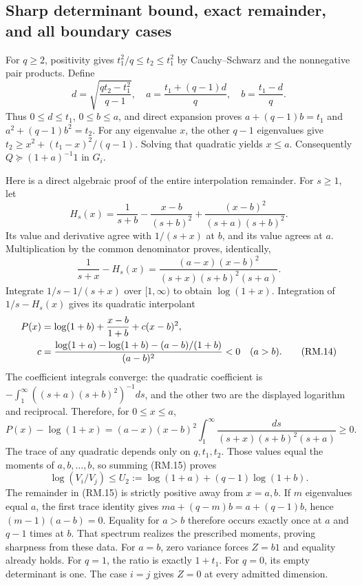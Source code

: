 \subsection{Sharp determinant bound, exact remainder, and all boundary cases}
For $q\ge2$, positivity gives $t_1^2/q\le t_2\le t_1^2$ by
Cauchy--Schwarz and the nonnegative pair products. Define
\begin{equation}
 d=\sqrt{\frac{qt_2-t_1^2}{q-1}},\quad
 a=\frac{t_1+(q-1)d}{q},\quad b=\frac{t_1-d}{q}.\tag{RM.11}
\end{equation}
Thus $0\le d\le t_1$, $0\le b\le a$, and direct expansion proves
$a+(q-1)b=t_1$ and $a^2+(q-1)b^2=t_2$.
For any eigenvalue $x$, the other $q-1$ eigenvalues give
$t_2\ge x^2+(t_1-x)^2/(q-1)$. Solving that quadratic yields $x\le a$.
Consequently $Q\succeq(1+a)^{-1}1$ in $G_i$.

Here is a direct algebraic proof of the entire interpolation remainder.
For $s\ge1$, let
\begin{equation}
 H_s(x)=\frac1{s+b}-\frac{x-b}{(s+b)^2}
       +\frac{(x-b)^2}{(s+a)(s+b)^2}.\tag{RM.12}
\end{equation}
Its value and derivative agree with $1/(s+x)$ at $b$, and its value
agrees at $a$. Multiplication by the common denominator proves, identically,
\begin{equation}
 \frac1{s+x}-H_s(x)
 =\frac{(a-x)(x-b)^2}{(s+x)(s+b)^2(s+a)}.\tag{RM.13}
\end{equation}
Integrate $1/s-1/(s+x)$ over $[1,\infty)$ to obtain $\log(1+x)$.
Integration of $1/s-H_s(x)$ gives its quadratic interpolant
\begin{align}
 P(x)&=\log(1+b)+\frac{x-b}{1+b}+c(x-b)^2,\notag\\
 c&=\frac{\log(1+a)-\log(1+b)-(a-b)/(1+b)}{(a-b)^2}<0\quad(a>b).
 \tag{RM.14}
\end{align}
The coefficient integrals converge: the quadratic coefficient is
$-\int_1^\infty((s+a)(s+b)^2)^{-1}ds$, and the other two are the
displayed logarithm and reciprocal. Therefore, for $0\le x\le a$,
\begin{equation}
 P(x)-\log(1+x)=(a-x)(x-b)^2
 \int_1^\infty\frac{ds}{(s+x)(s+b)^2(s+a)}\ge0.\tag{RM.15}
\end{equation}
The trace of any quadratic depends only on $q,t_1,t_2$. Those values
equal the moments of $a,b,\ldots,b$, so summing (RM.15) proves
\begin{equation}
 \log(V_i/V_j)\le U_2:=\log(1+a)+(q-1)\log(1+b).\tag{RM.16}
\end{equation}
The remainder in (RM.15) is strictly positive away from $x=a,b$. If $m$ eigenvalues
equal $a$, the first trace identity gives
$ma+(q-m)b=a+(q-1)b$, hence $(m-1)(a-b)=0$. Equality for $a>b$
therefore occurs exactly once at $a$ and $q-1$ times at $b$.
That spectrum realizes the prescribed moments, proving sharpness from
these data. For $a=b$, zero variance forces $Z=b1$ and equality already
holds. For $q=1$, the ratio is exactly $1+t_1$. For $q=0$, its empty
determinant is one. The case $i=j$ gives $Z=0$ at every admitted dimension.

